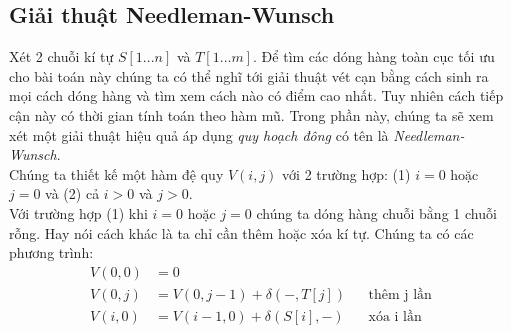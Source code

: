 \subsection{Giải thuật Needleman-Wunsch}
Xét 2 chuỗi kí tự $S[1...n]$ và $T[1...m]$. Để tìm các dóng hàng toàn cục tối ưu cho 
bài toán này chúng ta có thể nghĩ tới giải thuật vét cạn bằng cách sinh ra mọi cách 
dóng hàng và tìm xem cách nào có điểm cao nhất. Tuy nhiên cách tiếp cận này có thời
gian tính toán theo hàm mũ. Trong phần này, chúng ta sẽ xem xét một giải thuật hiệu quả
áp dụng \textit{quy hoạch đông} có tên là \textit{Needleman-Wunsch}. \\
Chúng ta thiết kế một hàm đệ quy $V(i,j)$ với 2 trường hợp: (1) $i = 0$ hoặc $j = 0$
và (2) cả $i > 0$ và $j > 0$. \\
Với trường hợp (1) khi $i = 0$ hoặc $j = 0$ chúng ta dóng hàng chuỗi bằng 1 chuỗi rỗng.
Hay nói cách khác là ta chỉ cần thêm hoặc xóa kí tự. Chúng ta có các phương trình:
\begin{equation}
    \begin{aligned}
        V(0, 0) &= 0 & \\
        V(0, j) &= V(0, j - 1) + \delta(-, T[j]) && \text{thêm j lần} \\
        V(i, 0) &= V(i -1, 0) + \delta(S[i], -) && \text{xóa i lần} 
    \end{aligned}
\end{equation}

